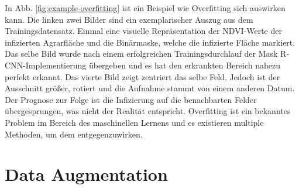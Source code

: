 \noindent
{}
In Abb. \ref{fig:example-overfitting} ist ein Beispiel wie Overfitting sich auswirken kann. Die linken zwei Bilder sind ein exemplarischer Auszug aus dem Trainingsdatensatz. Einmal eine visuelle Repräsentation der NDVI-Werte der infizierten Agrarfläche und die Binärmaske, welche die infizierte Fläche markiert. Das selbe Bild wurde nach einem erfolgreichen Trainingsdurchlauf der Mask R-CNN-Implementierung übergeben und es hat den erkrankten Bereich nahezu perfekt erkannt. Das vierte Bild zeigt zentriert das selbe Feld. Jedoch ist der Ausschnitt größer, rotiert und die Aufnahme stammt von einem anderen Datum. Der Prognose zur Folge ist die Infizierung auf die benachbarten Felder übergesprungen, was nicht der Realität entspricht. Overfitting ist ein bekanntes Problem im Bereich des maschinellen Lernens und es existieren multiple Methoden, um dem entgegenzuwirken.

\section{Data Augmentation}

